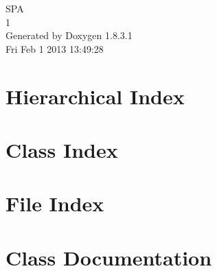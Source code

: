 \documentclass{book}
\begin{document}
\hypersetup{pageanchor=false,citecolor=blue}
\begin{titlepage}
\vspace*{7cm}
\begin{center}
{\Large S\-P\-A \\[1ex]\large 1 }\\
\vspace*{1cm}
{\large Generated by Doxygen 1.8.3.1}\\
\vspace*{0.5cm}
{\small Fri Feb 1 2013 13:49:28}\\
\end{center}
\end{titlepage}
\clearemptydoublepage
{}
\tableofcontents
\clearemptydoublepage
{}
\hypersetup{pageanchor=true,citecolor=blue}
\chapter{Hierarchical Index}

\chapter{Class Index}

\chapter{File Index}

\chapter{Class Documentation}


























\end{document}
